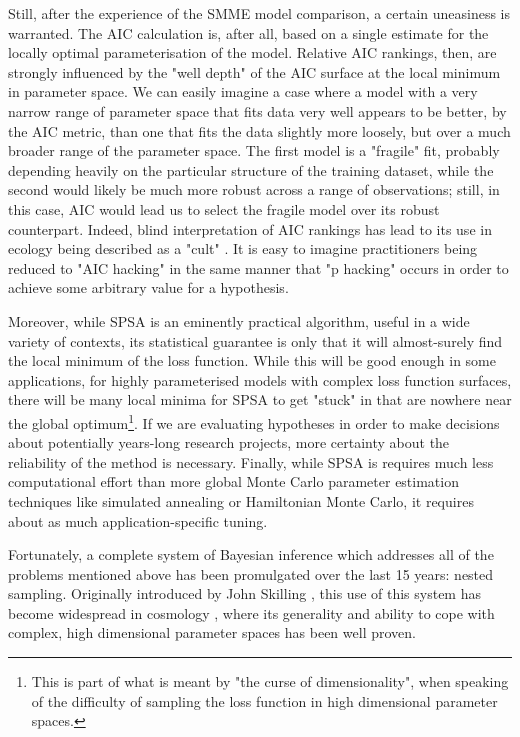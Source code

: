 Still, after the experience of the SMME model comparison, a certain uneasiness is warranted. The AIC calculation is, after all, based on a single estimate for the locally optimal parameterisation of the model. Relative AIC rankings, then, are strongly influenced by the "well depth" of the AIC surface at the local minimum in parameter space. We can easily imagine a case where a model with a very narrow range of parameter space that fits data very well appears to be better, by the AIC metric, than one that fits the data slightly more loosely, but over a much broader range of the parameter space. The first model is a "fragile" fit, probably depending heavily on the particular structure of the training dataset, while the second would likely be much more robust across a range of observations; still, in this case, AIC would lead us to select the fragile model over its robust counterpart. Indeed, blind interpretation of AIC rankings has lead to its use in ecology being described as a "cult" \cite{Brewer2020}. It is easy to imagine practitioners being reduced to "AIC hacking" in the same manner that "p hacking" occurs in order to achieve some arbitrary value for a hypothesis.

Moreover, while SPSA is an eminently practical algorithm, useful in a wide variety of contexts, its statistical guarantee is only that it will almost-surely find the local minimum of the loss function. While this will be good enough in some applications, for highly parameterised models with complex loss function surfaces, there will be many local minima for SPSA to get "stuck" in that are nowhere near the global optimum\footnote{This is part of what is meant by "the curse of dimensionality", when speaking of the difficulty of sampling the loss function in high dimensional parameter spaces.}. If we are evaluating hypotheses in order to make decisions about potentially years-long research projects, more certainty about the reliability of the method is necessary. Finally, while SPSA is requires much less computational effort than more global Monte Carlo parameter estimation techniques like simulated annealing or Hamiltonian Monte Carlo, it requires about as much application-specific tuning.

Fortunately, a complete system of Bayesian inference which addresses all of the problems mentioned above has been promulgated over the last 15 years: nested sampling. Originally introduced by John Skilling \cite{Skilling2006}, this use of this system has become widespread in cosmology \cite{Trotta2008}, where its generality and ability to cope with complex, high dimensional parameter spaces has been well proven. 

